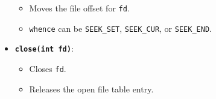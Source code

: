 \documentclass[8pt,twocolumn]{article}
\begin{document}
\begin{itemize}
    \begin{itemize}
      \setlength{\itemsep}{0pt} %
      \setlength{\parskip}{0pt}
      \item Moves the file offset for \texttt{fd}.
      \item \texttt{whence} can be \texttt{SEEK\_SET}, \texttt{SEEK\_CUR}, or \texttt{SEEK\_END}.
    \end{itemize}
\vspace{-0.6em}
  \item \textbf{\texttt{close(int fd)}}:
\vspace{-0.6em}
    \begin{itemize}
      \setlength{\itemsep}{0pt} %
      \setlength{\parskip}{0pt}
      \item Closes \texttt{fd}.
      \item Releases the open file table entry.
    \end{itemize}
\vspace{-1.2em}
\end{itemize}
\noindent{}
\noindent{}
\noindent{}
\end{document}
